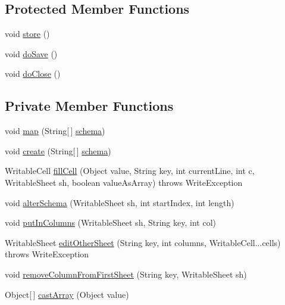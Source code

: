 \subsection*{Protected Member Functions}
\begin{DoxyCompactItemize}
\item 
void \hyperlink{classjenes_1_1utils_1_1_x_l_s_logger_ae6b3840ad6be8bdc558efaf6077d4ae4}{store} ()
\item 
void \hyperlink{classjenes_1_1utils_1_1_x_l_s_logger_a54c54393bf5a31442ebfc10517dfceea}{do\-Save} ()
\item 
void \hyperlink{classjenes_1_1utils_1_1_x_l_s_logger_acf58ddaa6873bcf626c9d24064a89b73}{do\-Close} ()
\end{DoxyCompactItemize}
\subsection*{Private Member Functions}
\begin{DoxyCompactItemize}
\item 
void \hyperlink{classjenes_1_1utils_1_1_x_l_s_logger_a9e141f15afe414a355c0ed0761e3fa33}{map} (String\mbox{[}$\,$\mbox{]} \hyperlink{classjenes_1_1utils_1_1_abstract_logger_a3a2030876857a0512fae7e0ad400c570}{schema})
\item 
void \hyperlink{classjenes_1_1utils_1_1_x_l_s_logger_aec0462235a0576302663ffe5ebebe302}{create} (String\mbox{[}$\,$\mbox{]} \hyperlink{classjenes_1_1utils_1_1_abstract_logger_a3a2030876857a0512fae7e0ad400c570}{schema})
\item 
Writable\-Cell \hyperlink{classjenes_1_1utils_1_1_x_l_s_logger_acc87ec46a39bd28e8fe95aa6866718c7}{fill\-Cell} (Object value, String key, int current\-Line, int c, Writable\-Sheet sh, boolean value\-As\-Array)  throws Write\-Exception 
\item 
void \hyperlink{classjenes_1_1utils_1_1_x_l_s_logger_ada2b2a6d9fdbd1daa9d719761dcd58fa}{alter\-Schema} (Writable\-Sheet sh, int start\-Index, int length)
\item 
void \hyperlink{classjenes_1_1utils_1_1_x_l_s_logger_a5e79e26762d4c866d71ef2f6e9a3a5f3}{put\-In\-Columns} (Writable\-Sheet sh, String key, int col)
\item 
Writable\-Sheet \hyperlink{classjenes_1_1utils_1_1_x_l_s_logger_a0de0d0ceef137f794cf86573b856b2dd}{edit\-Other\-Sheet} (String key, int columns, Writable\-Cell...\-cells)  throws Write\-Exception 
\item 
void \hyperlink{classjenes_1_1utils_1_1_x_l_s_logger_afda0752f2053af091fcfdc511fd674a7}{remove\-Column\-From\-First\-Sheet} (String key, Writable\-Sheet sh)
\item 
Object\mbox{[}$\,$\mbox{]} \hyperlink{classjenes_1_1utils_1_1_x_l_s_logger_a01f33738abad99c69762482bb43108cf}{cast\-Array} (Object value)
\end{DoxyCompactItemize}
